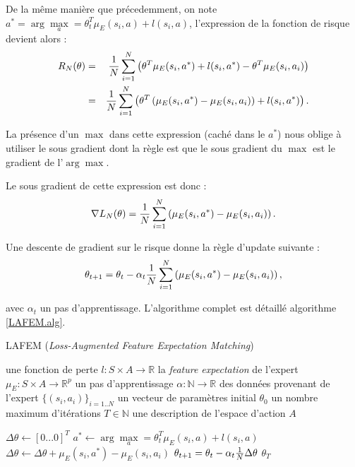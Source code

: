 \documentclass[publibook-draft]{CAp2012}
\begin{document}
   
   De la même manière que précedemment, on note $a^* = \arg\max\limits_{a} = \theta_t ^T \mu_E(s_i,a) + l(s_i,a)$, l'expression de la fonction de risque devient alors :
   \begin{eqnarray}
   R_N(\theta) &=& {1\over N} \sum_{i=1}^N\left(\theta ^T \mu_E(s_i,a^*) + l(s_i,a^*) - \theta ^T \mu_E(s_i,a_i) \right)\\
   &=& {1\over N} \sum_{i=1}^N\left(\theta^T\left(\mu_E(s_i,a^*) - \mu_E(s_i,a_i)\right) + l(s_i,a^*)  \right).
   \end{eqnarray}

   La présence d'un $\max$ dans cette expression (caché dans le $a^*$) nous oblige à utiliser le sous gradient dont la règle est que le sous gradient du $\max$ est le gradient de l'$\arg\max$.

   Le sous gradient de cette expression est donc : 
   \begin{equation}
   \nabla L_N(\theta) =  {1\over N}\sum_{i=1}^N\left(\mu_E(s_i,a^*) - \mu_E(s_i,a_i)\right).
   \end{equation}

   Une descente de gradient sur le risque donne la règle d'update suivante :
   \begin{equation}
   \theta_{t+1} = \theta_t -\alpha_t{1\over N}\sum_{i=1}^N\left(\mu_E(s_i,a^*) - \mu_E(s_i,a_i)\right),
   \end{equation}

   avec $\alpha_t$ un pas d'apprentissage. L'algorithme complet est détaillé algorithme \ref{LAFEM.alg}.

\begin{algorithm}
\caption{LAFEM ({\it Loss-Augmented Feature Expectation Matching})}
\label{LAFEM.alg}
\begin{algorithmic}
  \REQUIRE une fonction de perte $l : S\times A \rightarrow \mathbb R$
  \REQUIRE la \emph{feature expectation} de l'expert $\mu_E : S\times A \rightarrow \mathbb R ^p$
  \REQUIRE un pas d'apprentissage $\alpha : \mathbb N \rightarrow \mathbb R$
  \REQUIRE des données provenant de l'expert $\{(s_i,a_i)\}_{i=1..N}$
  \REQUIRE un vecteur de paramètres initial $\theta_0$
  \REQUIRE un nombre maximum d'itérations $T\in \mathbb N$
  \REQUIRE une description de l'espace d'action $A$

     
  \STATE $\Delta\theta \leftarrow [0...0]^T$
    \STATE $a^* \leftarrow \arg\max\limits_{a} = \theta_t ^T \mu_E(s_i,a) + l(s_i,a)$
    \STATE $\Delta\theta \leftarrow \Delta\theta + \mu_E(s_i,a^*) - \mu_E(s_i,a_i)$
    \ENDFOR
    \STATE $\theta_{t+1} = \theta_t -\alpha_t{1\over N}\Delta\theta$
    \ENDFOR
    \RETURN $\theta_T$
\end{algorithmic}
\end{algorithm}
\end{document}
